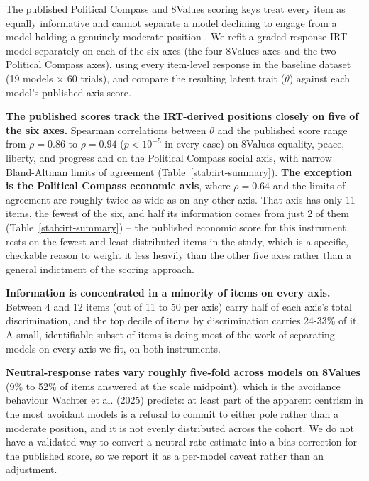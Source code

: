 \documentclass[11pt]{article}
\begin{document}
The published Political Compass and 8Values scoring keys treat every item as
equally informative and cannot separate a model declining to engage from a
model holding a genuinely moderate position \cite{wachter2025irt}. We refit a
graded-response IRT model separately on each of the six axes (the four
8Values axes and the two Political Compass axes), using every item-level
response in the baseline dataset (19 models $\times$ 60 trials), and compare
the resulting latent trait ($\theta$) against each model's published axis
score.

\textbf{The published scores track the IRT-derived positions closely on five
of the six axes.} Spearman correlations between $\theta$ and the published
score range from $\rho=0.86$ to $\rho=0.94$ ($p<10^{-5}$ in every case) on
8Values equality, peace, liberty, and progress and on the Political Compass
social axis, with narrow Bland-Altman limits of agreement
(Table~\ref{stab:irt-summary}). \textbf{The exception is the Political
Compass economic axis}, where $\rho=0.64$ and the limits of agreement are
roughly twice as wide as on any other axis. That axis has only 11 items, the
fewest of the six, and half its information comes from just 2 of them
(Table~\ref{stab:irt-summary}) -- the published economic score for this
instrument rests on the fewest and least-distributed items in the study,
which is a specific, checkable reason to weight it less heavily than the
other five axes rather than a general indictment of the scoring approach.

\textbf{Information is concentrated in a minority of items on every axis.}
Between 4 and 12 items (out of 11 to 50 per axis) carry half of each axis's
total discrimination, and the top decile of items by discrimination carries
24-33\% of it. A small, identifiable subset of items is doing most of the
work of separating models on every axis we fit, on both instruments.

\textbf{Neutral-response rates vary roughly five-fold across models on
8Values} (9\% to 52\% of items answered at the scale midpoint), which is the
avoidance behaviour Wachter et al. (2025) predicts: at least part of the
apparent centrism in the most avoidant models is a refusal to commit to
either pole rather than a moderate position, and it is not evenly distributed
across the cohort. We do not have a validated way to convert a neutral-rate
estimate into a bias correction for the published score, so we report it as a
per-model caveat rather than an adjustment.
\end{document}
